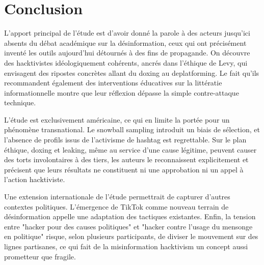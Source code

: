 \section{Conclusion}

L'apport principal de l'étude est d'avoir donné la parole à des acteurs jusqu'ici absents du débat académique sur la désinformation, ceux qui ont précisément inventé les outils aujourd'hui détournés à des fins de propagande. On découvre des hacktivistes idéologiquement cohérents, ancrés dans l'éthique de Levy, qui envisagent des ripostes concrètes allant du doxing au deplatforming. Le fait qu'ils recommandent également des interventions éducatives sur la littératie informationnelle montre que leur réflexion dépasse la simple contre-attaque technique.

\medskip

L'étude est exclusivement américaine, ce qui en limite la portée pour un phénomène transnational. Le snowball sampling introduit un biais de sélection, et l'absence de profils issus de l'activisme de hashtag est regrettable. Sur le plan éthique, doxing et leaking, même au service d'une cause légitime, peuvent causer des torts involontaires à des tiers, les auteurs le reconnaissent explicitement et précisent que leurs résultats ne constituent ni une approbation ni un appel à l'action hacktiviste. 

\medskip

Une extension internationale de l'étude permettrait de capturer d'autres contextes politiques. L'émergence de TikTok comme nouveau terrain de désinformation appelle une adaptation des tactiques existantes. Enfin, la tension entre "hacker pour des causes politiques" et "hacker contre l'usage du mensonge en politique" risque, selon plusieurs participants, de diviser le mouvement sur des lignes partisanes, ce qui fait de la misinformation hacktivism un concept aussi prometteur que fragile.
